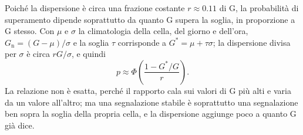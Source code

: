 Poiché la dispersione è circa una frazione costante $r\approx0.11$ di G, la probabilità di superamento dipende soprattutto da quanto G supera la soglia, in proporzione a G stesso. Con $\mu$ e $\sigma$ la climatologia della cella, del giorno e dell'ora, $G_{\mathrm{n}}=(G-\mu)/\sigma$ e la soglia $\tau$ corrisponde a $G^{*}=\mu+\tau\sigma$; la dispersione divisa per $\sigma$ è circa $rG/\sigma$, e quindi
\begin{equation}
p\approx\Phi\!\left(\frac{1-G^{*}/G}{r}\right).
\end{equation}
La relazione non è esatta, perché il rapporto cala sui valori di G più alti e varia da un valore all'altro; ma una segnalazione stabile è soprattutto una segnalazione ben sopra la soglia della propria cella, e la dispersione aggiunge poco a quanto G già dice.

